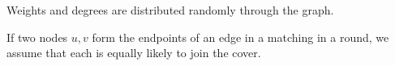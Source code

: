 \begin{assm}
\label{assm:distribution}
Weights and degrees are distributed randomly through the graph.
\end{assm}
\begin{assm}
\label{assm:likelihood}
If two nodes $u,v$ form the endpoints of an edge in a matching in a round, we assume that each is equally likely to join the cover. 
\end{assm}
